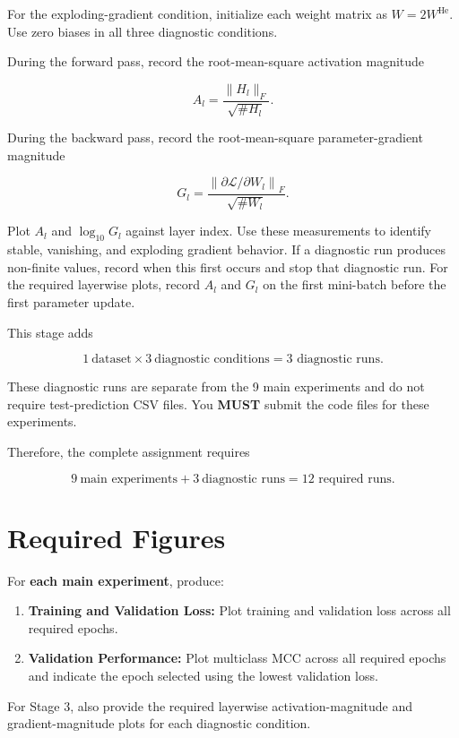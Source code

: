 \documentclass[11pt,a4paper]{article}
\begin{document}
For the exploding-gradient condition, initialize each weight matrix as $W=2W^{\mathrm{He}}$. Use zero biases in all three diagnostic conditions.

During the forward pass, record the root-mean-square activation magnitude

\[
A_l=\frac{\|H_l\|_F}{\sqrt{\# H_l}}.
\]

During the backward pass, record the root-mean-square parameter-gradient magnitude

\[
G_l=
\frac{\left\|\partial\mathcal{L}/\partial W_l\right\|_F}
{\sqrt{\# W_l}}.
\]

Plot $A_l$ and $\log_{10}G_l$ against layer index. Use these measurements to identify stable, vanishing, and exploding gradient behavior. If a diagnostic run produces non-finite values, record when this first occurs and stop that diagnostic run. For the required layerwise plots, record $A_l$ and $G_l$ on the first mini-batch before the first parameter update.

This stage adds

\[
1\ \text{dataset}\times3\ \text{diagnostic conditions}
=\boxed{3\text{ diagnostic runs}}.
\]

These diagnostic runs are separate from the 9 main experiments and do not require test-prediction CSV files. You \textbf{MUST} submit the code files for these experiments.

Therefore, the complete assignment requires

\[
9\ \text{main experiments}+3\ \text{diagnostic runs}
=\boxed{12\text{ required runs}}.
\]

\section{Required Figures}

For \textbf{each main experiment}, produce:

\begin{enumerate}
    \item \textbf{Training and Validation Loss:} Plot training and validation loss across all required epochs.
    \item \textbf{Validation Performance:} Plot multiclass MCC across all required epochs and indicate the epoch selected using the lowest validation loss.
\end{enumerate}

For Stage 3, also provide the required layerwise activation-magnitude and gradient-magnitude plots for each diagnostic condition.
\end{document}
